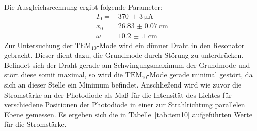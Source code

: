 %
Die Ausgleichsrechnung ergibt folgende Parameter:
%
\begin{align*}
  I_0=&\SI{370(3)}{\micro\ampere} \\
  x_0=&\SI{26.83(7)}{\centi\meter} \\
  \omega=&\SI{10.2(1)}{\centi\meter}
\end{align*}
%
Zur Untersuchung der $\text{TEM}_{10}$-Mode wird ein dünner Draht in den Resonator gebracht. Dieser dient dazu, die Grundmode durch Störung zu
unterdrücken. Befindet sich der Draht gerade am Schwingungsmaximum der Grundmode und stört diese somit maximal, so wird die $\text{TEM}_{10}$-Mode
gerade minimal gestört, da sich an dieser Stelle ein Minimum befindet. Anschließend wird wie zuvor die Stromstärke an der Photodiode als Maß für die
Intensität des Lichtes für verschiedene Positionen der Photodiode in einer zur Strahlrichtung parallelen Ebene gemessen. Es ergeben sich die in
Tabelle~\ref{tab:tem10} aufgeführten Werte für die Stromstärke.
%
